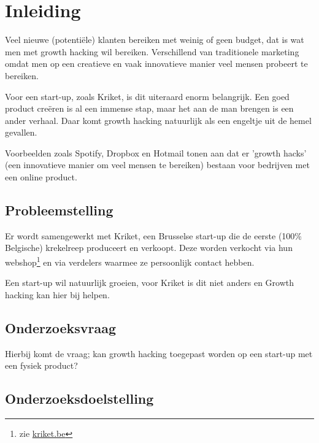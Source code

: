
\chapter{Inleiding}
\label{ch:inleiding}

Veel nieuwe (potentiële) klanten bereiken met weinig of geen budget, dat is wat men met growth hacking wil bereiken. Verschillend van traditionele marketing omdat men op een creatieve en vaak innovatieve manier veel mensen probeert te bereiken. 

Voor een start-up, zoals Kriket, is dit uiteraard enorm belangrijk. Een goed product creëren is al een immense stap, maar het aan de man brengen is een ander verhaal. Daar komt growth hacking natuurlijk als een engeltje uit de hemel gevallen. 

Voorbeelden zoals Spotify, Dropbox en Hotmail tonen aan dat er 'growth hacks' (een innovatieve manier om veel mensen te bereiken) bestaan voor bedrijven met een online product.

\section{Probleemstelling}
\label{sec:probleemstelling}

Er wordt samengewerkt met Kriket, een Brusselse start-up die de eerste (100\% Belgische) krekelreep produceert en verkoopt. Deze worden verkocht via hun webshop\footnote{zie \href{https://kriket.be}{kriket.be}} en via verdelers waarmee ze persoonlijk contact hebben.

Een start-up wil natuurlijk groeien, voor Kriket is dit niet anders en Growth hacking kan hier bij helpen.

\section{Onderzoeksvraag}
\label{sec:onderzoeksvraag}

Hierbij komt de vraag; kan growth hacking toegepast worden op een start-up met een fysiek product?

\section{Onderzoeksdoelstelling}
\label{sec:onderzoeksdoelstelling}

